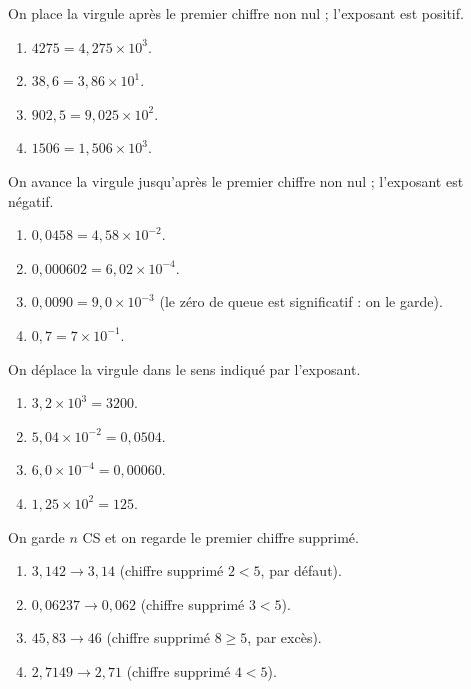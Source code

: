 \documentclass[11pt,a4paper]{article}
\begin{document}
\begin{corrige}
On place la virgule après le premier chiffre non nul ; l'exposant est positif.
\begin{enumerate}[label=\alph*)]
  \item $4275 = 4,275\times10^{3}$.
  \item $38,6 = 3,86\times10^{1}$.
  \item $902,5 = 9,025\times10^{2}$.
  \item $1506 = 1,506\times10^{3}$.
\end{enumerate}
\end{corrige}

\begin{corrige}
On avance la virgule jusqu'après le premier chiffre non nul ; l'exposant est négatif.
\begin{enumerate}[label=\alph*)]
  \item $0,0458 = 4,58\times10^{-2}$.
  \item $0,000602 = 6,02\times10^{-4}$.
  \item $0,0090 = 9,0\times10^{-3}$ (le zéro de queue est significatif : on le garde).
  \item $0,7 = 7\times10^{-1}$.
\end{enumerate}
\end{corrige}

\begin{corrige}
On déplace la virgule dans le sens indiqué par l'exposant.
\begin{enumerate}[label=\alph*)]
  \item $3,2\times10^{3} = 3200$.
  \item $5,04\times10^{-2} = 0,0504$.
  \item $6,0\times10^{-4} = 0,00060$.
  \item $1,25\times10^{2} = 125$.
\end{enumerate}
\end{corrige}

\begin{corrige}
On garde $n$ CS et on regarde le premier chiffre supprimé.
\begin{enumerate}[label=\alph*)]
  \item $3,142 \to 3,14$ (chiffre supprimé $2<5$, par défaut).
  \item $0,06237 \to 0,062$ (chiffre supprimé $3<5$).
  \item $45,83 \to 46$ (chiffre supprimé $8\ge5$, par excès).
  \item $2,7149 \to 2,71$ (chiffre supprimé $4<5$).
\end{enumerate}
\end{corrige}
\end{document}
